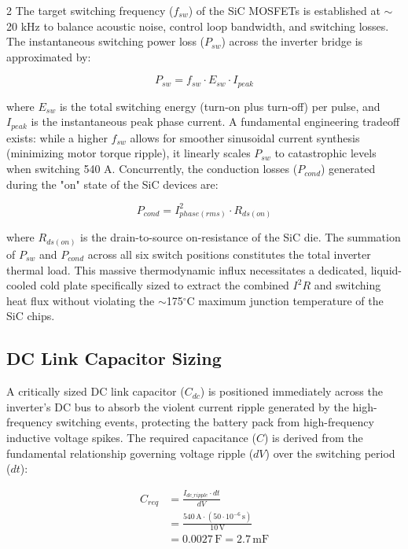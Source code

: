 \begin{multicols}{2}
The target switching frequency ($f_{sw}$) of the SiC MOSFETs is established at $\sim$20 kHz to balance acoustic noise, control loop bandwidth, and switching losses. The instantaneous switching power loss ($P_{sw}$) across the inverter bridge is approximated by:

\begin{equation} \label{eq:switching_loss}
P_{sw} = f_{sw} \cdot E_{sw} \cdot I_{peak}
\end{equation}

where $E_{sw}$ is the total switching energy (turn-on plus turn-off) per pulse, and $I_{peak}$ is the instantaneous peak phase current. A fundamental engineering tradeoff exists: while a higher $f_{sw}$ allows for smoother sinusoidal current synthesis (minimizing motor torque ripple), it linearly scales $P_{sw}$ to catastrophic levels when switching 540 A. Concurrently, the conduction losses ($P_{cond}$) generated during the "on" state of the SiC devices are:

\begin{equation} \label{eq:conduction_loss}
P_{cond} = I_{phase(rms)}^2 \cdot R_{ds(on)}
\end{equation}

where $R_{ds(on)}$ is the drain-to-source on-resistance of the SiC die. The summation of $P_{sw}$ and $P_{cond}$ across all six switch positions constitutes the total inverter thermal load. This massive thermodynamic influx necessitates a dedicated, liquid-cooled cold plate specifically sized to extract the combined $I^2R$ and switching heat flux without violating the $\sim$175$^\circ$C maximum junction temperature of the SiC chips.

\subsection{DC Link Capacitor Sizing}

A critically sized DC link capacitor ($C_{dc}$) is positioned immediately across the inverter's DC bus to absorb the violent current ripple generated by the high-frequency switching events, protecting the battery pack from high-frequency inductive voltage spikes. The required capacitance ($C$) is derived from the fundamental relationship governing voltage ripple ($dV$) over the switching period ($dt$):

\begin{equation} \label{eq:capacitance_deriv}
\begin{split}
C_{req} &= \frac{I_{dc\_ripple} \cdot dt}{dV} \\
&= \frac{540\,\mathrm{A} \cdot (50 \cdot 10^{-6}\,\mathrm{s})}{10\,\mathrm{V}} \\
&= 0.0027\,\mathrm{F} = 2.7\,\mathrm{mF}
\end{split}
\end{equation}


\end{multicols}
